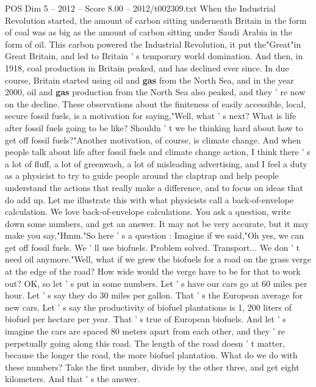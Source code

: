 \begin{textsample}{POS Dim 5 – 2012 – Score 8.00 – 2012/t002309.txt}  \label{ex:f5_pos_037}
When the Industrial Revolution started, the amount of carbon sitting underneath Britain in the form of coal was as big as the amount of carbon sitting under Saudi Arabia in the form of oil.
This carbon powered the Industrial Revolution, it put the"Great"in Great Britain, and led to Britain ' s temporary world domination.
And then, in 1918, coal production in Britain peaked, and has declined ever since.
In due course, Britain started using oil and \textbf{gas} from the North Sea, and in the year 2000, oil and \textbf{gas} production from the North Sea also peaked, and they ' re now on the decline.
These observations about the finiteness of easily accessible, local, secure fossil fuels, is a motivation for saying,"Well, what ' s next?
What is life after fossil fuels going to be like?
Shouldn ' t we be thinking hard about how to get off fossil fuels?"Another motivation, of course, is climate change.
And when people talk about life after fossil fuels and climate change action, I think there ' s a lot of fluff, a lot of greenwash, a lot of misleading advertising, and I feel a duty as a physicist to try to guide people around the claptrap and help people understand the actions that really make a difference, and to focus on ideas that do add up.
Let me illustrate this with what physicists call a back-of-envelope calculation.
We love back-of-envelope calculations.
You ask a question, write down some numbers, and get an answer.
It may not be very accurate, but it may make you say,"Hmm."So here ' s a question : Imagine if we said,"Oh yes, we can get off fossil fuels.
We ' ll use biofuels.
Problem solved.
Transport...
We don ' t need oil anymore."Well, what if we grew the biofuels for a road on the grass verge at the edge of the road?
How wide would the verge have to be for that to work out?
OK, so let ' s put in some numbers.
Let ' s have our cars go at 60 miles per hour.
Let ' s say they do 30 miles per gallon.
That ' s the European average for new cars.
Let ' s say the productivity of biofuel plantations is 1, 200 liters of biofuel per hectare per year.
That ' s true of European biofuels.
And let ' s imagine the cars are spaced 80 meters apart from each other, and they ' re perpetually going along this road.
The length of the road doesn ' t matter, because the longer the road, the more biofuel plantation.
What do we do with these numbers?
Take the first number, divide by the other three, and get eight kilometers.
And that ' s the answer.

\end{textsample}
